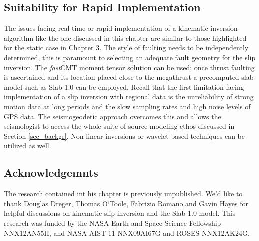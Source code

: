 \subsection{Suitability for Rapid Implementation}

The issues facing real-time or rapid implementation of a kinematic inversion algorithm like the one discussed in this chapter are similar to those highlighted for the static case in Chapter 3. The style of faulting needs to be independently determined, this is paramount to selecting an adequate fault geometry for the slip inversion. The \textit{fast}CMT moment tensor solution can be used; once thrust faulting is ascertained and its location placed close to the megathrust a precomputed slab model such as Slab 1.0 \citep{hayes2012} can be employed. Recall that the first limitation facing implementation of a slip inversion with regional data is the unreliability of strong motion data at long periods and the slow sampling rates and high noise levels of GPS data. The seismogeodetic approach overcomes this and allows the seismologist to access the whole suite of source modeling ethos discussed in Section \ref{sec_backgr}. Non-linear inversions or wavelet based techniques can be utilized as well.

\subsection{Acknowledgemnts}

The research contained int his chapter is previously unpublished. We'd like to thank Douglas Dreger, Thomas O`Toole, Fabrizio Romano and Gavin Hayes for helpful discussions on kinematic slip inversion and the Slab 1.0 model. This research was funded by the NASA Earth and Space Science Fellowship NNX12AN55H, and NASA AIST-11 NNX09AI67G and ROSES NNX12AK24G.

